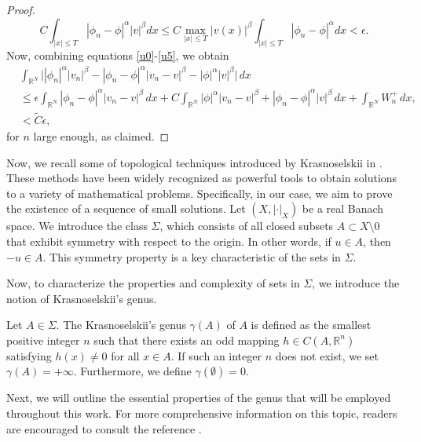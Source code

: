 \documentclass[reqno]{amsart}
\begin{document}
\begin{proof}
\begin{equation}
C\int_{|x|\leq T}|\phi_n-\phi|^\alpha|v|^\beta dx\leq C \max_{|x|\leq T}|v(x)|^\beta \int_{|x|\leq T}|\phi_n-\phi|^\alpha dx<\epsilon.
\end{equation}
Now, combining equations \eqref{u0}-\eqref{u5}, we obtain
\begin{align*}
&\int_{\mathbb{R}^N}\Big||\phi_n|^\alpha|v_n|^\beta-|\phi_n-\phi|^\alpha|v_n-v|^\beta
 -|\phi|^\alpha|v|^\beta\Big|\,dx\\
&\leq \epsilon \int_{\mathbb{R}^N}|\phi_n-\phi|^\alpha|v_n-v|^\beta\,dx
+C\int_{\mathbb{R}^N}|\phi|^\alpha|v_n-v|^\beta+|\phi_n-\phi|^\alpha|v|^\beta\,dx
+\int_{\mathbb{R}^N} W_n^+\,dx,\\
&< \tilde{C}\epsilon,
\end{align*}
for $n$ large enough, as claimed.
\end{proof}

Now, we recall some of topological techniques introduced by Krasnoselskii in \cite{cc}. 
These methods have been widely recognized as powerful tools to obtain solutions to 
a variety of mathematical problems. Specifically, in our case, we aim to prove the 
existence of a sequence of small solutions. Let $(X,|\cdot|_X)$ be a real Banach space. 
We introduce the class $\Sigma$, which consists of all closed subsets 
$A\subset X\setminus{0}$ that exhibit symmetry with respect to the origin. 
In other words, if $u\in A$, then $-u\in A$. This symmetry property is a key 
characteristic of the sets in $\Sigma$.

Now,  to characterize the properties and complexity of sets in $\Sigma$, 
we introduce the notion of Krasnoselskii's genus.

\begin{definition}\label{genus} \rm
Let $A\in \Sigma$. The Krasnoselskii's genus $\gamma(A)$ of $A$ is defined as the 
smallest positive integer $n$ such that there exists an odd mapping 
$h\in C(A,\mathbb{R}^n)$ satisfying $h(x)\neq 0$ for all $x\in A$. 
If such an integer $n$ does not exist, we set $\gamma(A)=+\infty$. Furthermore, 
we define $\gamma(\emptyset)=0$.
\end{definition}

Next, we will outline the essential properties of the genus that will be 
employed throughout this work. For more comprehensive information on this topic, 
readers are encouraged to consult the reference \cite{cc}.
\end{document}
